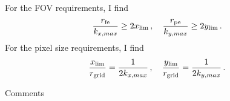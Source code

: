 \documentclass[dvipsnames]{beamer}
\begin{document}
\begin{frame}
For the FOV requirements, I find
\begin{equation*}
\frac{r_{\rm fe}}{k_{x,max}} \geq 2x_{\rm lim}\,, \quad \frac{r_{\rm pe}}{k_{y,max}} \geq 2y_{\rm lim}\,.
\end{equation*}
For the pixel size requirements, I find
\begin{equation*}
\frac{x_{\rm lim}}{r_{\rm grid}} = \frac{1}{2k_{x,max}}\,, \quad \frac{y_{\rm lim}}{r_{\rm grid}} = \frac{1}{2k_{y,max}}\,.
\end{equation*}
\end{frame}

\begin{frame}{Comments}

\end{frame}
\end{document}
